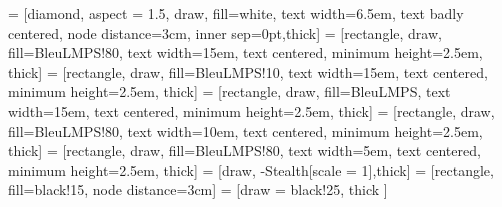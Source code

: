  = [diamond, aspect = 1.5, draw, fill=white, text width=6.5em, text badly centered, node distance=3cm, inner sep=0pt,thick]
 = [rectangle, draw, fill=BleuLMPS!80, text width=15em, text centered, minimum height=2.5em, thick]
 = [rectangle, draw, fill=BleuLMPS!10, text width=15em, text centered, minimum height=2.5em, thick]
 = [rectangle, draw, fill=BleuLMPS, text width=15em, text centered, minimum height=2.5em, thick]
 = [rectangle, draw, fill=BleuLMPS!80, text width=10em, text centered, minimum height=2.5em, thick]
 = [rectangle, draw, fill=BleuLMPS!80, text width=5em, text centered, minimum height=2.5em, thick]
 = [draw, -{Stealth[scale = 1]},thick]
 = [rectangle, fill=black!15, node distance=3cm]
 = [draw = black!25, thick ]

